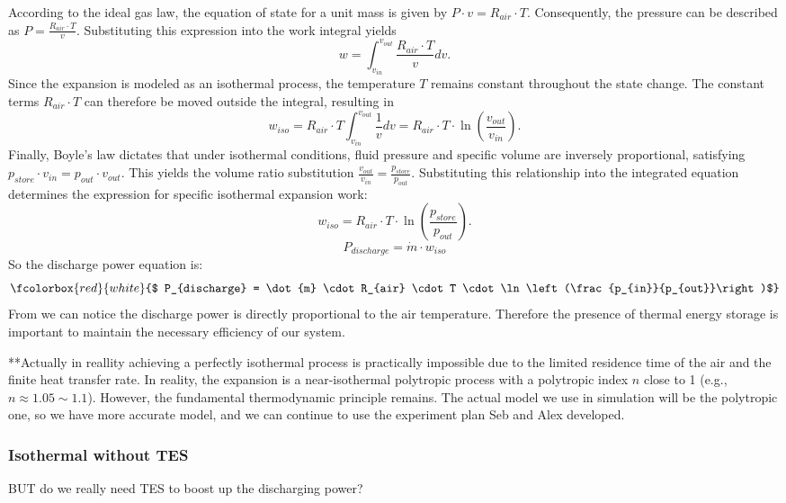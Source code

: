 According to the ideal gas law, the equation of state for a unit mass is given by $P \cdot v = R_{air} \cdot T$. Consequently, the pressure can be described as $P = \frac{R_{air} \cdot T}{v}$. Substituting this expression into the work integral yields
$$
w = \int_{v_{in}}^{v_{out}} \frac{R_{air} \cdot T}{v} dv.
$$
Since the expansion is modeled as an isothermal process, the temperature $T$ remains constant throughout the state change. The constant terms $R_{air} \cdot T$ can therefore be moved outside the integral, resulting in
$$
w_{iso} = R_{air} \cdot T \int_{v_{in}}^{v_{out}} \frac{1}{v}  dv = R_{air} \cdot T \cdot \ln\left(\frac{v_{out}}{v_{in}}\right).
$$
Finally, Boyle's law dictates that under isothermal conditions, fluid pressure and specific volume are inversely proportional, satisfying $p_{store} \cdot v_{in} = p_{out} \cdot v_{out}$. This yields the volume ratio substitution $\frac{v_{out}}{v_{in}} = \frac{p_{store}}{p_{out}}$. Substituting this relationship into the integrated equation determines the expression for specific isothermal expansion work:
\begin{equation}
w_{iso} = R_{air} \cdot T \cdot \ln\left(\frac{p_{store}}{p_{out}}\right).
\end{equation}
$$P_{discharge} = \dot{m} \cdot w_{iso}$$
So the discharge power equation is:
\begin{equation}
   \fcolorbox{red}{white}{$ P_{discharge} = \dot{m} \cdot R_{air} \cdot T \cdot \ln\left(\frac{p_{in}}{p_{out}}\right)$}
\end{equation}
From  we can notice the discharge power is directly proportional to the air temperature. Therefore the presence of thermal energy storage is important to maintain the necessary efficiency of our system. 

**Actually in reallity achieving a perfectly isothermal process is practically impossible due to the limited residence time of the air and the finite heat transfer rate. In reality, the expansion is a near-isothermal polytropic process with a polytropic index $n$ close to 1 (e.g., $n \approx 1.05 \sim 1.1$). However, the fundamental thermodynamic principle remains. The actual model we use in simulation will be the polytropic one, so we have more accurate model, and we can continue to use the experiment plan Seb and Alex developed.
\subsubsection{Isothermal without TES}
BUT do we really need TES to boost up the discharging power?

